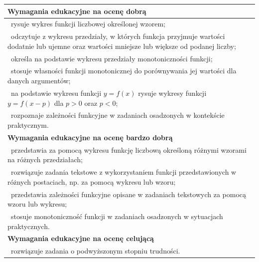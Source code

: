 \documentclass[12pt,a4paper]{article}
\begin{document}
\begin{longtable}{|p{16cm}|}
		\textbf{Wymagania edukacyjne na ocenę dobrą} \\ \hline
		
		\textbullet\ rysuje wykres funkcji liczbowej określonej wzorem; \\
		
		\textbullet\ odczytuje z wykresu przedziały, w których funkcja przyjmuje wartości dodatnie lub ujemne oraz wartości mniejsze lub większe od podanej liczby; \\
		
		\textbullet\ określa na podstawie wykresu przedziały monotoniczności funkcji; \\
		
		\textbullet\ stosuje własności funkcji monotonicznej do porównywania jej wartości dla danych argumentów; \\
		
		\textbullet\ na podstawie wykresu funkcji $y=f(x)$ rysuje wykresy funkcji $y=f(x-p)$ dla $p>0$ oraz $p<0$; \\
		
		\textbullet\ rozpoznaje zależności funkcyjne w zadaniach osadzonych w kontekście praktycznym. \\ \hline
		
		\textbf{Wymagania edukacyjne na ocenę bardzo dobrą} \\ \hline
		
		\textbullet\ przedstawia za pomocą wykresu funkcję liczbową określoną różnymi wzorami na różnych przedziałach; \\
		
		\textbullet\ rozwiązuje zadania tekstowe z wykorzystaniem funkcji przedstawionych w różnych postaciach, np. za pomocą wykresu lub wzoru; \\
		
		\textbullet\ przedstawia zależności funkcyjne opisane w zadaniach tekstowych za pomocą wzoru lub wykresu; \\
		
		\textbullet\ stosuje monotoniczność funkcji w zadaniach osadzonych w sytuacjach praktycznych. \\ \hline
		
		\textbf{Wymagania edukacyjne na ocenę celującą} \\ \hline
		
		\textbullet\ rozwiązuje zadania o podwyższonym stopniu trudności. \\ \hline
		
	\end{longtable}
	
\end{document}
